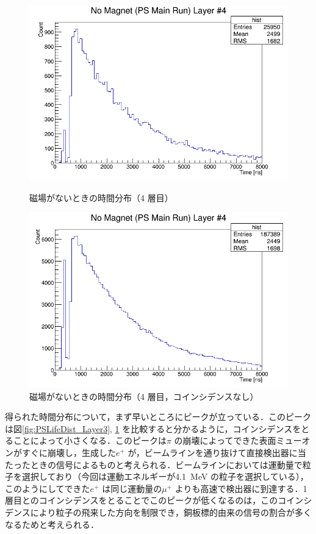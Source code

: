 \begin{figure}[h]
\begin{minipage}{0.45\textwidth}
	\includegraphics[width = \textwidth]{figure/odagawa/PSLifetimeDist_Layer3.png}
	\caption{磁場がないときの時間分布（4 層目）}
	\label{fig:PSLifeDist_Layer3}
	\end{minipage}
	\begin{minipage}{0.45\textwidth}
	\centering
	\includegraphics[width = \textwidth]{figure/odagawa/PSLifetimeDistNoCoin_Layer3.png}
	\caption{磁場がないときの時間分布（4 層目，コインシデンスなし）}
	\label{fig:PSLifeDistNoCoin_Layer3}
	\end{minipage}
\end{figure}%

得られた時間分布について，まず早いところにピークが立っている．このピークは図\ref{fig:PSLifeDist_Layer3}, \ref{fig:PSLifeDistNoCoin_Layer3} を比較すると分かるように，コインシデンスをとることによって小さくなる．このピークは$\pi$ の崩壊によってできた表面ミューオンがすぐに崩壊し，生成した$e^{+}$ が，ビームラインを通り抜けて直接検出器に当たったときの信号によるものと考えられる．ビームラインにおいては運動量で粒子を選択しており（今回は運動エネルギーが4.1~MeV の粒子を選択している），このようにしてできた$e^{+}$ は同じ運動量の$\mu^{+}$ よりも高速で検出器に到達する．1 層目とのコインシデンスをとることでこのピークが低くなるのは，このコインシデンスにより粒子の飛来した方向を制限でき，銅板標的由来の信号の割合が多くなるためと考えられる．

